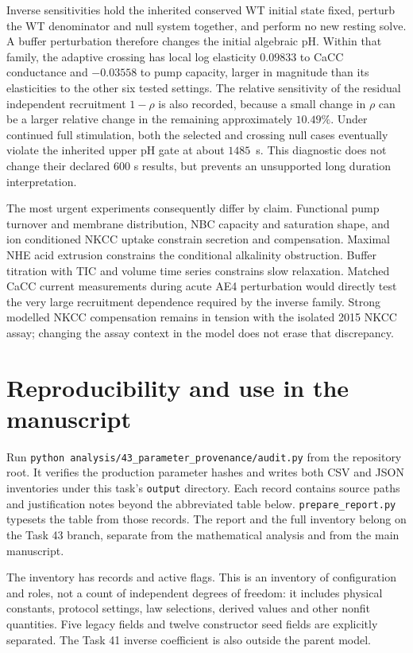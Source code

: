 Inverse sensitivities hold the inherited conserved WT initial state fixed, perturb the WT denominator and null system together, and perform no new resting solve. A buffer perturbation therefore changes the initial algebraic pH. Within that family, the adaptive crossing has local log elasticity $0.09833$ to CaCC conductance and $-0.03558$ to pump capacity, larger in magnitude than its elasticities to the other six tested settings. The relative sensitivity of the residual independent recruitment $1-\rho$ is also recorded, because a small change in $\rho$ can be a larger relative change in the remaining approximately $10.49\%$. Under continued full stimulation, both the selected and crossing null cases eventually violate the inherited upper pH gate at about $1485$~s. This diagnostic does not change their declared 600 s results, but prevents an unsupported long duration interpretation.

The most urgent experiments consequently differ by claim. Functional pump turnover and membrane distribution, NBC capacity and saturation shape, and ion conditioned NKCC uptake constrain secretion and compensation. Maximal NHE acid extrusion constrains the conditional alkalinity obstruction. Buffer titration with TIC and volume time series constrains slow relaxation. Matched CaCC current measurements during acute AE4 perturbation would directly test the very large recruitment dependence required by the inverse family. Strong modelled NKCC compensation remains in tension with the isolated 2015 NKCC assay; changing the assay context in the model does not erase that discrepancy.

\section{Reproducibility and use in the manuscript}
Run \texttt{python analysis/43\_parameter\_provenance/audit.py} from the repository root. It verifies the production parameter hashes and writes both CSV and JSON inventories under this task's \texttt{output} directory. Each record contains source paths and justification notes beyond the abbreviated table below. \texttt{prepare\_report.py} typesets the table from those records. The report and the full inventory belong on the Task 43 branch, separate from the mathematical analysis and from the main manuscript.

The inventory has \InventoryCount{} records and \ActiveCount{} active flags. This is an inventory of configuration and roles, not a count of independent degrees of freedom: it includes physical constants, protocol settings, law selections, derived values and other nonfit quantities. Five legacy fields and twelve constructor seed fields are explicitly separated. The Task 41 inverse coefficient is also outside the parent model.

